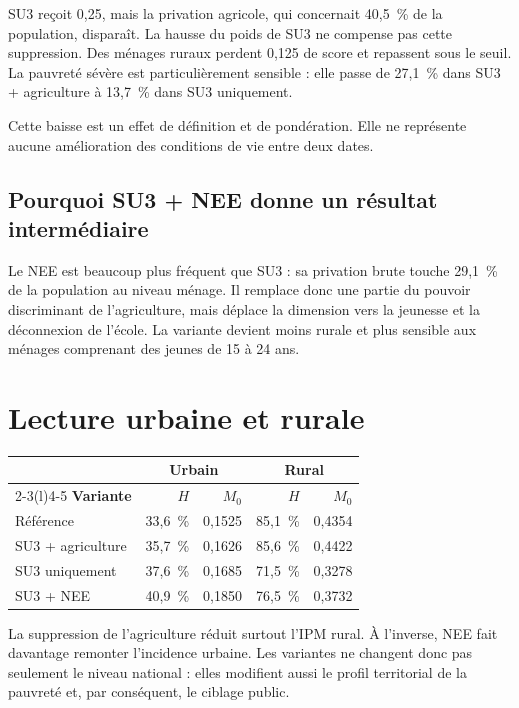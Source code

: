 \documentclass[11pt,a4paper]{article}
\begin{document}
SU3 reçoit 0,25, mais la privation agricole, qui concernait 40,5~\% de la population, disparaît.
La hausse du poids de SU3 ne compense pas cette suppression. Des ménages ruraux perdent 0,125 de
score et repassent sous le seuil. La pauvreté sévère est particulièrement sensible : elle passe
de 27,1~\% dans SU3 + agriculture à 13,7~\% dans SU3 uniquement.

Cette baisse est un effet de définition et de pondération. Elle ne représente aucune amélioration
des conditions de vie entre deux dates.

\subsection{Pourquoi SU3 + NEE donne un résultat intermédiaire}

Le NEE est beaucoup plus fréquent que SU3 : sa privation brute touche 29,1~\% de la population au
niveau ménage. Il remplace donc une partie du pouvoir discriminant de l'agriculture, mais déplace
la dimension vers la jeunesse et la déconnexion de l'école. La variante devient moins rurale et
plus sensible aux ménages comprenant des jeunes de 15 à 24 ans.

\section{Lecture urbaine et rurale}

\begin{center}
\small
\begin{tabular}{@{}p{4.6cm}rrrr@{}}
\toprule
& \multicolumn{2}{c}{\textbf{Urbain}} & \multicolumn{2}{c}{\textbf{Rural}} \\
\cmidrule(lr){2-3}\cmidrule(l){4-5}
\textbf{Variante} & $H$ & $M_0$ & $H$ & $M_0$ \\
\midrule
Référence & 33,6~\% & 0,1525 & 85,1~\% & 0,4354 \\
SU3 + agriculture & 35,7~\% & 0,1626 & 85,6~\% & 0,4422 \\
SU3 uniquement & 37,6~\% & 0,1685 & 71,5~\% & 0,3278 \\
SU3 + NEE & 40,9~\% & 0,1850 & 76,5~\% & 0,3732 \\
\bottomrule
\end{tabular}
\end{center}

La suppression de l'agriculture réduit surtout l'IPM rural. À l'inverse, NEE fait davantage
remonter l'incidence urbaine. Les variantes ne changent donc pas seulement le niveau national :
elles modifient aussi le profil territorial de la pauvreté et, par conséquent, le ciblage public.
\end{document}
